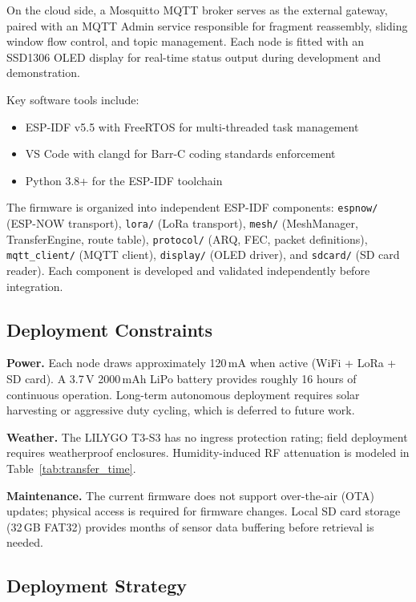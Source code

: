 \documentclass[conference]{IEEEtran}
\begin{document}
On the cloud side, a Mosquitto MQTT broker serves as the external gateway, paired with an MQTT Admin service responsible for fragment reassembly, sliding window flow control, and topic management. Each node is fitted with an SSD1306 OLED display for real-time status output during development and demonstration.

Key software tools include:
\begin{itemize}
  \item ESP-IDF v5.5 with FreeRTOS for multi-threaded task management
  \item VS Code with clangd for Barr-C coding standards enforcement
  \item Python 3.8+ for the ESP-IDF toolchain
\end{itemize}

The firmware is organized into independent ESP-IDF components: \texttt{espnow/} (ESP-NOW transport), \texttt{lora/} (LoRa transport), \texttt{mesh/} (MeshManager, TransferEngine, route table), \texttt{protocol/} (ARQ, FEC, packet definitions), \texttt{mqtt\_client/} (MQTT client), \texttt{display/} (OLED driver), and \texttt{sdcard/} (SD card reader). Each component is developed and validated independently before integration.

\subsection{Deployment Constraints}

\textbf{Power.} Each node draws approximately 120\,mA when active (WiFi + LoRa + SD card). A 3.7\,V 2000\,mAh LiPo battery provides roughly 16 hours of continuous operation. Long-term autonomous deployment requires solar harvesting or aggressive duty cycling, which is deferred to future work.

\textbf{Weather.} The LILYGO T3-S3 has no ingress protection rating; field deployment requires weatherproof enclosures. Humidity-induced RF attenuation is modeled in Table~\ref{tab:transfer_time}.

\textbf{Maintenance.} The current firmware does not support over-the-air (OTA) updates; physical access is required for firmware changes. Local SD card storage (32\,GB FAT32) provides months of sensor data buffering before retrieval is needed.

\subsection{Deployment Strategy}
\end{document}
